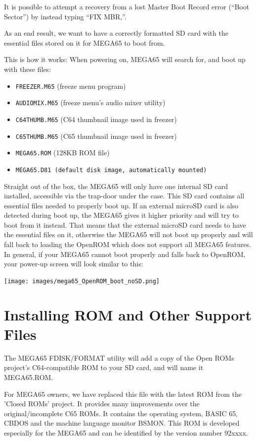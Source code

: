 It is possible to attempt a recovery from a lost Master Boot Record error (``Boot Sector'') by instead typing ``FIX MBR,''.


As an end result, we want to have a correctly formatted SD card with the essential files stored on it for MEGA65 to boot from.

This is how it works: When powering on, MEGA65 will search for, and boot up with these files:
\begin{itemize}
\item {\tt FREEZER.M65} (freeze menu program)
\item {\tt AUDIOMIX.M65} (freeze menu's audio mixer utility)
\item {\tt C64THUMB.M65} (C64 thumbnail image used in freezer)
\item {\tt C65THUMB.M65} (C65 thumbnail image used in freezer)
\item {\tt MEGA65.ROM}   (128KB ROM file)
\item {\tt MEGA65.D81 (default disk image, automatically mounted)}
\end{itemize}

Straight out of the box, the MEGA65 will only have one internal SD card installed, accessible via the trap-door under the case. This SD card contains all essential files needed to properly boot up.
If an external microSD card is also detected during boot up, the MEGA65 gives it higher priority and will try to boot from it instead.
That means that the external microSD card needs to have the essential files on it, otherwise the MEGA65 will not boot up properly and will fall back to loading the OpenROM which does not support all MEGA65 features.
In general, if your MEGA65 cannot boot properly and falls back to OpenROM, your power-up screen will look similar to this:

\texttt{[image: images/mega65\_OpenROM\_boot\_noSD.png]}


\section{Installing ROM and Other Support Files}
\label{sec:installingrometc}

The MEGA65 FDISK/FORMAT utility will add a copy of the Open ROMs project's C64-compatible ROM 
to your SD card, and will name it MEGA65.ROM.

For MEGA65 owners, we have replaced this file with the latest ROM from the 'Closed ROMs'
project. It provides many improvements over the original/incomplete C65 ROMs. It contains
the operating system, BASIC 65, CBDOS and the machine language monitor BSMON.
This ROM is developed especially for the MEGA65 and can be
identified by the version number 92xxxx.

